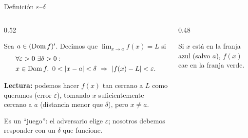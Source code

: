 \documentclass[10pt,aspectratio=169]{beamer}
\begin{document}
\begin{frame}{Definición $\varepsilon$--$\delta$}
  \begin{columns}
    \begin{column}{0.52\textwidth}
      \begin{definicion}
        Sea $a\in(\operatorname{Dom} f)'$. Decimos que $\displaystyle\lim_{x\to a}f(x)=L$ si
        \begin{align*}
          &\forall\varepsilon>0\ \exists\delta>0:\\
          &x\in\Dom f,\ 0<|x-a|<\delta\ \Rightarrow\ |f(x)-L|<\varepsilon.
        \end{align*}
      \end{definicion}
      \textbf{Lectura:} podemos hacer $f(x)$ tan cercano a $L$ como queramos (error $\varepsilon$), tomando $x$ suficientemente
      cercano a $a$ (distancia menor que $\delta$), pero $x\neq a$.
      \begin{idea}
        Es un ``juego'': el adversario elige $\varepsilon$; nosotros debemos responder con un $\delta$ que funcione.
      \end{idea}
    \end{column}
    \begin{column}{0.48\textwidth}
      \centering

      \small Si $x$ está en la franja azul (salvo $a$), $f(x)$ cae en la franja verde.
    \end{column}
  \end{columns}
\end{frame}
\end{document}

